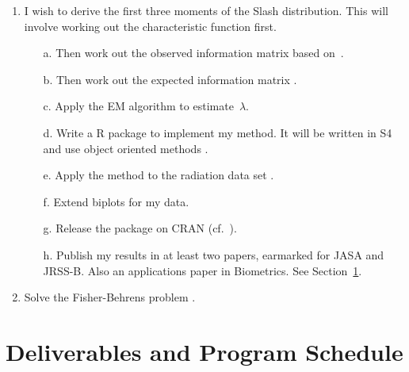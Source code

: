 \documentclass[12pt,a4paper]{article}
\newcommand{\RR}{{\textsf{R}}}
\begin{document}
\begin{enumerate}

\item
I wish to derive the first three moments of the Slash distribution.
This will involve working out the characteristic function first.


\begin{itemize}

\item[a.]
Then work out the observed information matrix
based on~\cite{bick:etal:2009}.

\item[b.]
Then work out the expected information matrix
\citep{scot:lee:wild:2007}.

\item[c.]
Apply the EM algorithm \citep{demp:lair:rubi:1977} to estimate~$\lambda$.

\item[d.]
Write a \RR{} package to implement my method.
It will be written in S4 and use object oriented methods
\citep{cham:1998}.

\item[e.]
Apply the method to the radiation data set
\citep{MR2526777}.

\item[f.]
Extend biplots \citep{gowe:1966} for my data.

\item[g.]
Release the package on CRAN
(cf.~\cite{murr:ihak:2000}).

\item[h.]
Publish my results in at least two papers,
earmarked for JASA and JRSS-B.
Also an applications paper in Biometrics.
See Section~\ref{sec:timeline}.

\end{itemize}



\item
Solve the Fisher-Behrens problem
\citep{efro:2009,MR2415600,MR2508377}.


\end{enumerate}







\section{Deliverables and Program Schedule}
\label{sec:timeline}
\end{document}
